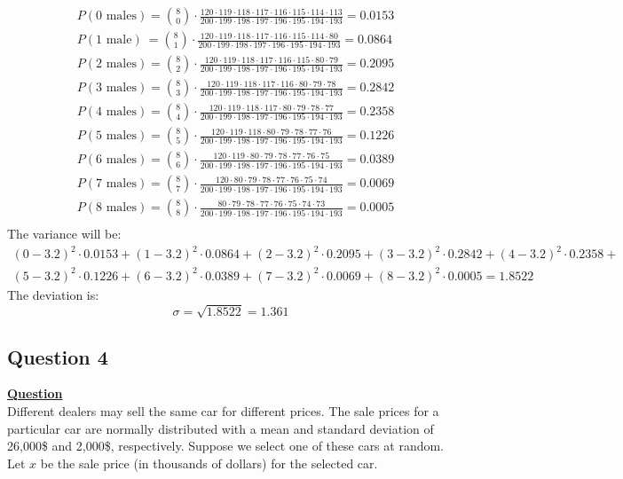 \documentclass[a4, 12pt,titlepage]{scrartcl}
\begin{document}
\begin{align*}
&P(\textrm{0 males}) =\binom{8}{0}\cdot \frac{120\cdot119\cdot118\cdot117\cdot116\cdot115\cdot114\cdot113}{200\cdot199\cdot198\cdot197\cdot196\cdot195\cdot194\cdot193} =0.0153
\\
&P(\textrm{1 male})\ =\binom{8}{1}\cdot \frac{120\cdot119\cdot118\cdot117\cdot116\cdot115\cdot114\cdot80}{200\cdot199\cdot198\cdot197\cdot196\cdot195\cdot194\cdot193}=0.0864
\\
&P(\textrm{2 males})=\binom{8}{2}\cdot \frac{120\cdot119\cdot118\cdot117\cdot116\cdot115\cdot80\cdot79}{200\cdot199\cdot198\cdot197\cdot196\cdot195\cdot194\cdot193}=0.2095
\\
&P(\textrm{3 males})=\binom{8}{3}\cdot \frac{120\cdot119\cdot118\cdot117\cdot116\cdot80\cdot79\cdot78}{200\cdot199\cdot198\cdot197\cdot196\cdot195\cdot194\cdot193}=0.2842
\\
&P(\textrm{4 males})=\binom{8}{4}\cdot \frac{120\cdot119\cdot118\cdot117\cdot80\cdot79\cdot78\cdot77}{200\cdot199\cdot198\cdot197\cdot196\cdot195\cdot194\cdot193}=0.2358
\\
&P(\textrm{5 males})=\binom{8}{5}\cdot \frac{120\cdot119\cdot118\cdot80\cdot79\cdot78\cdot77\cdot76}{200\cdot199\cdot198\cdot197\cdot196\cdot195\cdot194\cdot193}=0.1226
\\
&P(\textrm{6 males})=\binom{8}{6}\cdot \frac{120\cdot119\cdot80\cdot79\cdot78\cdot77\cdot76\cdot75}{200\cdot199\cdot198\cdot197\cdot196\cdot195\cdot194\cdot193}=0.0389
\\
&P(\textrm{7 males})=\binom{8}{7}\cdot \frac{120\cdot80\cdot79\cdot78\cdot77\cdot76\cdot75\cdot74}{200\cdot199\cdot198\cdot197\cdot196\cdot195\cdot194\cdot193}=0.0069
\\
&P(\textrm{8 males})=\binom{8}{8}\cdot \frac{80\cdot79\cdot78\cdot77\cdot76\cdot75\cdot74\cdot73}{200\cdot199\cdot198\cdot197\cdot196\cdot195\cdot194\cdot193}=0.0005
\\
\end{align*}
The variance will be:
\begin{multline*}
(0-3.2)^2\cdot 0.0153+(1-3.2)^2\cdot 0.0864 + (2-3.2)^2\cdot 0.2095 + (3-3.2)^2\cdot 0.2842 + (4-3.2)^2 \cdot 0.2358 +\\
 (5-3.2)^2 \cdot 0.1226 + (6-3.2)^2 \cdot 0.0389 + (7-3.2)^2 \cdot 0.0069 + (8-3.2)^2 \cdot 0.0005=1.8522
\end{multline*}
The deviation is:\[
\boxed{\sigma= \sqrt{1.8522}=1.361}
\]
\newpage

\subsection{Question 4}
\textbf{\underline{Question}}\\
Different dealers may sell the same car for different prices.
The sale prices for a particular car are normally distributed with a mean and standard deviation of 26,000\$ and 2,000\$, respectively.
 Suppose we select one of these cars at random.
 Let $x$ be the sale price (in thousands of dollars) for the selected car.\\
 
\end{document}
